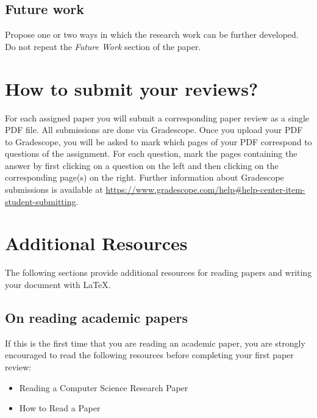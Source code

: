 \documentclass[acmsmall,nonacm]{acmart}
\begin{document}
\subsection{Future work}
Propose one or two ways in which the research work can be further developed. Do not repeat the {\it Future Work} section of the paper.

\section{How to submit your reviews?}
For each assigned paper you will submit a corresponding paper review as a single PDF file.  All submissions are done via Gradescope.  Once you upload your PDF to Gradescope, you will be asked to mark which pages of your PDF correspond to questions of the assignment.  For each question, mark the pages containing the answer by first clicking on a question on the left and then clicking on the corresponding page(s) on the right.  Further information about Gradescope submissions is available at \url{https://www.gradescope.com/help#help-center-item-student-submitting}.

\section{Additional Resources}
The following sections provide additional resources for reading papers and writing your document with \LaTeX.

\subsection{On reading academic papers}
If this is the first time that you are reading an academic paper, you are strongly encouraged to read the following resources before completing your first paper review:

\begin{itemize}
    \item Reading a Computer Science Research Paper~\cite{Fong-2009}
    \item How to Read a Paper~\cite{Keshav-2007}
\end{itemize}
\end{document}
